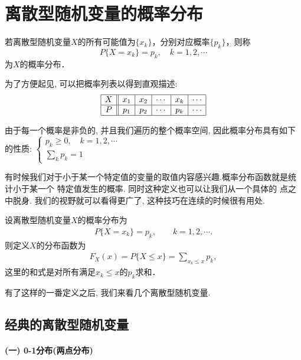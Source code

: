 \section{离散型随机变量的概率分布}

\begin{definition}[概率分布]
    若离散型随机变量$X$的所有可能值为$\{x_k\}$，分别对应概率$\{p_k\}$，则称
    $$P\{X=x_k\}=p_k, \quad k=1,2,\cdots$$
    为$X$的概率分布．
\end{definition}

为了方便起见, 可以把概率列表以得到直观描述:
\[\begin{array}{|c||c|c|c|c|c|}\hline
        X & x_1 & x_2 & \cdots & x_k & \cdots \\ \hline
        P & p_1 & p_2 & \cdots & p_k & \cdots \\ \hline
    \end{array}\]

由于每一个概率是非负的, 并且我们遍历的整个概率空间, 因此概率分布具有如下的性质:
$\displaystyle \left\{ \begin{array}{l} p_k\ge 0, \quad k=1,2,\cdots \\
        \sum\limits_{k}{p_k}=1\end{array} \right.$

有时候我们对于小于某一个特定值的变量的取值内容感兴趣.概率分布函数就是统计小于某一个
特定值发生的概率.
同时这种定义也可以让我们从一个具体的
点之中脱身. 我们的视野就可以看得更广了, 这种技巧在连续的时候很有用处.

\begin{definition}[概率分布函数]
    设离散型随机变量$X$的概率分布为
    \begin{align*}
        P\{X=x_k\}=p_k,\qquad k=1,2,\cdots.
    \end{align*}
    则定义$X$的分布函数为
    \begin{align*}
        F_X(x)=P\{X\le x\}=\sum_{x_k\le x} p_k,
    \end{align*}
    这里的和式是对所有满足$x_k\le x$的$p_k$求和．
\end{definition}

有了这样的一番定义之后, 我们来看几个离散型随机变量.

\subsection{经典的离散型随机变量}

\paragraph{(一) 0-1分布(两点分布)}

